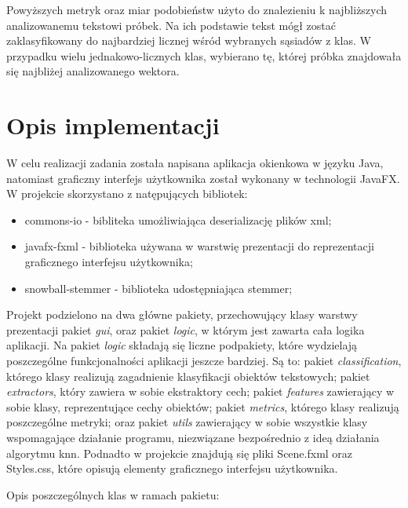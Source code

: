 \documentclass{classrep}
\begin{document}
Powyższych metryk oraz miar podobieństw użyto do znalezieniu k najbliższych analizowanemu tekstowi próbek. Na ich podstawie tekst mógł zostać zaklasyfikowany do najbardziej licznej wśród wybranych sąsiadów z klas. W przypadku wielu jednakowo-licznych klas, wybierano tę, której próbka znajdowała się najbliżej analizowanego wektora.

\section{Opis implementacji}

W celu realizacji zadania została napisana aplikacja okienkowa w języku Java, natomiast graficzny interfejs użytkownika został wykonany w technologii JavaFX.
W projekcie skorzystano z natępujących bibliotek:
\begin{itemize}
	\item commons-io - bibliteka umożliwiająca deserializację plików xml; \cite{commons-io}
	\item javafx-fxml - biblioteka używana w warstwię prezentacji do reprezentacji graficznego interfejsu użytkownika; \cite{JavaFX}
	\item snowball-stemmer - biblioteka udostępniająca stemmer; \cite{Stemmer}
\end{itemize}

Projekt podzielono na dwa główne pakiety, przechowujący klasy warstwy prezentacji pakiet \textit{gui}, oraz pakiet \textit{logic}, w którym jest zawarta cała logika aplikacji. Na pakiet \textit{logic} składają się liczne podpakiety, które wydzielają poszczególne funkcjonalności aplikacji jeszcze bardziej. Są to: pakiet \textit{classification}, którego klasy realizują zagadnienie klasyfikacji obiektów tekstowych; pakiet \textit{extractors}, który zawiera w sobie ekstraktory cech; pakiet \textit{features} zawierający w sobie klasy, reprezentujące cechy obiektów; pakiet \textit{metrics}, którego klasy realizują poszczególne metryki; oraz pakiet \textit{utils} zawierający w sobie wszystkie klasy wspomagające działanie programu, niezwiązane bezpośrednio z ideą działania algorytmu knn. Podnadto w projekcie znajdują się pliki Scene.fxml oraz Styles.css, które opisują elementy graficznego interfejsu użytkownika.

Opis poszczególnych klas w ramach pakietu:
\end{document}
